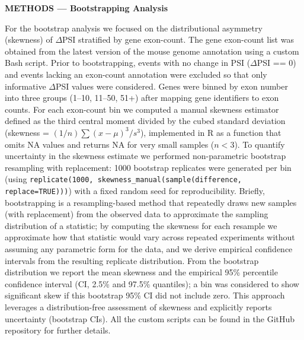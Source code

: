 \documentclass[12pt]{article}
\begin{document}
\begin{center}
\textbf{METHODS --- Bootstrapping Analysis}
\end{center}

\vspace{1em}

For the bootstrap analysis we focused on the distributional asymmetry (skewness) of $\Delta$PSI stratified by gene exon-count. The gene exon-count list was obtained from the latest version of the mouse genome annotation using a custom Bash script. Prior to bootstrapping, events with no change in PSI ($\Delta$PSI == 0) and events lacking an exon-count annotation were excluded so that only informative $\Delta$PSI values were considered. Genes were binned by exon number into three groups (1--10, 11--50, 51+) after mapping gene identifiers to exon counts. For each exon-count bin we computed a manual skewness estimator defined as the third central moment divided by the cubed standard deviation (skewness = $(1/n) \sum(x-\mu)^3 / s^3$), implemented in R as a function that omits NA values and returns NA for very small samples ($n<3$). To quantify uncertainty in the skewness estimate we performed non-parametric bootstrap resampling with replacement: 1000 bootstrap replicates were generated per bin (using \texttt{replicate(1000, skewness\_manual(sample(difference, replace=TRUE)))}) with a fixed random seed for reproducibility. Briefly, bootstrapping is a resampling-based method that repeatedly draws new samples (with replacement) from the observed data to approximate the sampling distribution of a statistic; by computing the skewness for each resample we approximate how that statistic would vary across repeated experiments without assuming any parametric form for the data, and we derive empirical confidence intervals from the resulting replicate distribution. From the bootstrap distribution we report the mean skewness and the empirical 95\% percentile confidence interval (CI, 2.5\% and 97.5\% quantiles); a bin was considered to show significant skew if this bootstrap 95\% CI did not include zero. This approach leverages a distribution-free assessment of skewness and explicitly reports uncertainty (bootstrap CIs). All the custom scripts can be found in the GitHub repository for further details.
\end{document}

